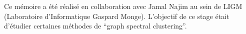 Ce mémoire a été réalisé en collaboration avec Jamal Najim au sein de LIGM (Laboratoire d'Informatique Gaspard Monge).
L'objectif de ce stage était d'étudier certaines méthodes de ``graph spectral clustering''.